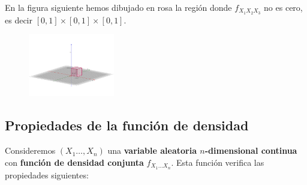\documentclass[]{book}
\begin{document}
En la figura siguiente hemos dibujado en rosa la región donde \(f_{X_1X_2X_3}\) no es cero, es decir \([0,1]\times [0,1]\times [0,1]\).

\begin{figure}
\includegraphics[width=1.48in]{Images/Cubo3D2} \end{figure}

\hypertarget{propiedades-de-la-funciuxf3n-de-densidad-1}{%
\subsection{Propiedades de la función de densidad}\label{propiedades-de-la-funciuxf3n-de-densidad-1}}

Consideremos \((X_1\ldots,X_n)\) una \textbf{variable aleatoria \(n\)-dimensional continua} con \textbf{función de densidad conjunta} \(f_{X_1\ldots X_n}\). Esta función verifica las propiedades siguientes:
\end{document}
